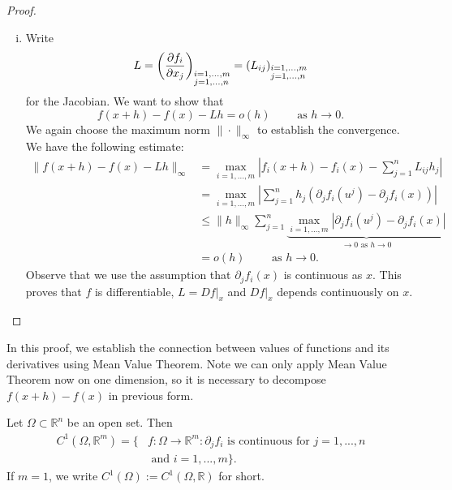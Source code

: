 \documentclass[10pt]{article}
\newcommand{\R}{\mathbb{R}}
\begin{document}
\begin{proof}
\begin{enumerate}[(i)]
      \item Write
      \[
        L = \left(\frac{\partial f_{i}}{\partial x_{j}}\right)_{\begin{subarray}
          ~i = 1,...,m \\ j = 1,...,n
        \end{subarray}} = (L_{ij})_{\begin{subarray}
          ~i = 1,...,m \\ j = 1,...,n
        \end{subarray}}
      \]
      for the Jacobian. We want to show that
      \[
        f(x+h)-f(x)-Lh = o(h) \qquad \text{ as }h \to 0.  
      \]
      We again choose the maximum norm $\|\cdot\|_{\infty}$ to establish the convergence. We have the following estimate:
      \[
        \begin{aligned}
          \|f(x+h)-f(x)-Lh\|_{\infty} &= \mathop{\max}_{i = 1,...,m}\left|f_{i}(x+h)-f_{i}(x)-\sum_{j = 1}^{n}L_{ij}h_{j}\right|\\ 
          &= \mathop{\max}_{i = 1,...,m}\left|\sum_{j = 1}^{n}h_{j}(\partial_{j}f_{i}(u^{j}) - \partial_{j}f_{i}(x))\right|\\
          & \leq \|h\|_{\infty} \sum_{j = 1}^{n}
          \underbrace{\mathop{\max}_{i = 1,...,m}|\partial_{j}f_{i}(u^{j}) - \partial_{j}f_{i}(x)|}
          _{\to 0 \text{ as }h \to 0}\\
          &= o(h) \qquad \text{ as }h \to 0.
        \end{aligned}
      \]
      Observe that we use the assumption that $\partial_{j}f_{i}(x)$ is continuous as $x$.
      This proves that $f$ is differentiable, $L = Df|_{x}$ and $Df|_{x}$ depends continuously on $x$.
    \end{enumerate}
  \end{proof}

  \begin{remark}
    In this proof, we establish the connection between values of functions and its derivatives using Mean Value Theorem.
    Note we can only apply Mean Value Theorem now on one dimension, so it is necessary to decompose $f(x+h)-f(x)$ in previous form.

    Let $\Omega \subset \R^{n}$ be an open set. Then
    \[
      \begin{split}
        C^{1}(\Omega,\R^{m}) = \{
          &f : \Omega \to \R^{m} : \partial_{j}f_{i} \text{ is continuous for }j = 1,...,n\\
          &\text{ and }i = 1,...,m
        \}.
      \end{split}
    \]
    If $m = 1$, we write $C^{1}(\Omega) := C^{1}(\Omega,\R)$ for short.
  \end{remark}
\end{document}
